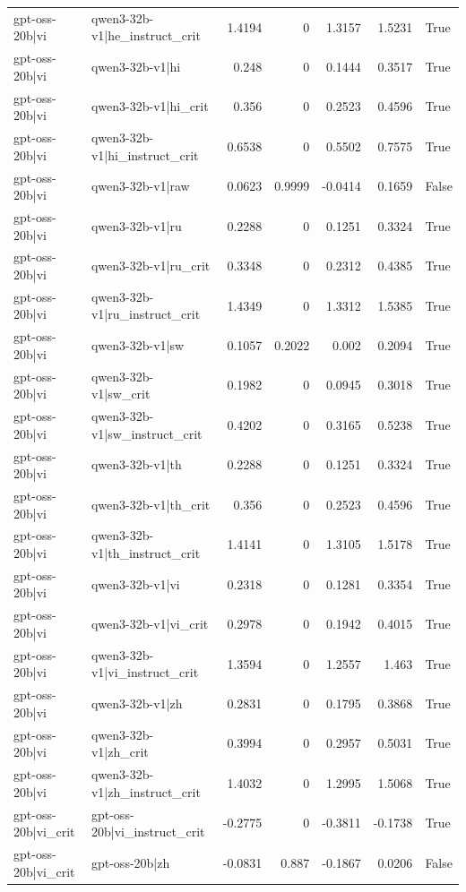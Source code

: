 \begin{table}
\begin{tabular}{l l r r r r l}
gpt-oss-20b|vi & qwen3-32b-v1|he_instruct_crit & 1.4194 & 0 & 1.3157 & 1.5231 & True \\
gpt-oss-20b|vi & qwen3-32b-v1|hi & 0.248 & 0 & 0.1444 & 0.3517 & True \\
gpt-oss-20b|vi & qwen3-32b-v1|hi_crit & 0.356 & 0 & 0.2523 & 0.4596 & True \\
gpt-oss-20b|vi & qwen3-32b-v1|hi_instruct_crit & 0.6538 & 0 & 0.5502 & 0.7575 & True \\
gpt-oss-20b|vi & qwen3-32b-v1|raw & 0.0623 & 0.9999 & -0.0414 & 0.1659 & False \\
gpt-oss-20b|vi & qwen3-32b-v1|ru & 0.2288 & 0 & 0.1251 & 0.3324 & True \\
gpt-oss-20b|vi & qwen3-32b-v1|ru_crit & 0.3348 & 0 & 0.2312 & 0.4385 & True \\
gpt-oss-20b|vi & qwen3-32b-v1|ru_instruct_crit & 1.4349 & 0 & 1.3312 & 1.5385 & True \\
gpt-oss-20b|vi & qwen3-32b-v1|sw & 0.1057 & 0.2022 & 0.002 & 0.2094 & True \\
gpt-oss-20b|vi & qwen3-32b-v1|sw_crit & 0.1982 & 0 & 0.0945 & 0.3018 & True \\
gpt-oss-20b|vi & qwen3-32b-v1|sw_instruct_crit & 0.4202 & 0 & 0.3165 & 0.5238 & True \\
gpt-oss-20b|vi & qwen3-32b-v1|th & 0.2288 & 0 & 0.1251 & 0.3324 & True \\
gpt-oss-20b|vi & qwen3-32b-v1|th_crit & 0.356 & 0 & 0.2523 & 0.4596 & True \\
gpt-oss-20b|vi & qwen3-32b-v1|th_instruct_crit & 1.4141 & 0 & 1.3105 & 1.5178 & True \\
gpt-oss-20b|vi & qwen3-32b-v1|vi & 0.2318 & 0 & 0.1281 & 0.3354 & True \\
gpt-oss-20b|vi & qwen3-32b-v1|vi_crit & 0.2978 & 0 & 0.1942 & 0.4015 & True \\
gpt-oss-20b|vi & qwen3-32b-v1|vi_instruct_crit & 1.3594 & 0 & 1.2557 & 1.463 & True \\
gpt-oss-20b|vi & qwen3-32b-v1|zh & 0.2831 & 0 & 0.1795 & 0.3868 & True \\
gpt-oss-20b|vi & qwen3-32b-v1|zh_crit & 0.3994 & 0 & 0.2957 & 0.5031 & True \\
gpt-oss-20b|vi & qwen3-32b-v1|zh_instruct_crit & 1.4032 & 0 & 1.2995 & 1.5068 & True \\
gpt-oss-20b|vi_crit & gpt-oss-20b|vi_instruct_crit & -0.2775 & 0 & -0.3811 & -0.1738 & True \\
gpt-oss-20b|vi_crit & gpt-oss-20b|zh & -0.0831 & 0.887 & -0.1867 & 0.0206 & False \\

\end{tabular}
\end{table}
